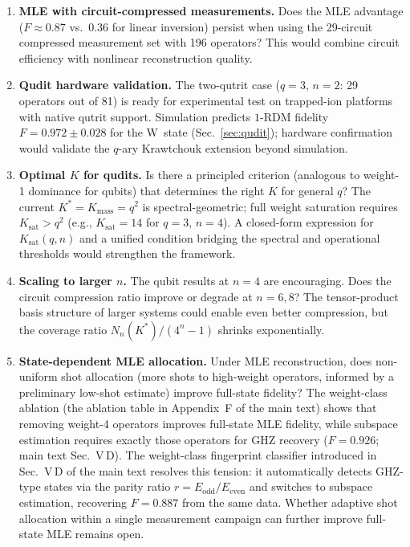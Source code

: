 \documentclass[twocolumn,prx,aps,superscriptaddress,longbibliography]{revtex4-2}
\begin{document}
\begin{enumerate}
\item \textbf{MLE with circuit-compressed measurements.}
Does the MLE advantage ($F \approx 0.87$ vs.\ $0.36$ for linear
inversion) persist when using the 29-circuit compressed measurement
set with 196 operators?  This would combine circuit efficiency with
nonlinear reconstruction quality.

\item \textbf{Qudit hardware validation.}
The two-qutrit case ($q = 3$, $n = 2$: 29 operators out of 81) is
ready for experimental test on trapped-ion platforms with native
qutrit support.  Simulation predicts $1$-RDM fidelity
$F = 0.972 \pm 0.028$ for the W~state
(Sec.~\ref{sec:qudit}); hardware confirmation would
validate the $q$-ary Krawtchouk extension beyond simulation.

\item \textbf{Optimal $K$ for qudits.}
Is there a principled criterion (analogous to weight-1 dominance
for qubits) that determines the right $K$ for general $q$?  The
current $K^* = K_{\mathrm{mass}} = q^2$ is spectral-geometric;
full weight saturation requires $K_{\mathrm{sat}} > q^2$
(e.g., $K_{\mathrm{sat}} = 14$ for $q = 3$, $n = 4$).
A closed-form expression for $K_{\mathrm{sat}}(q,n)$ and a
unified condition bridging the spectral and operational
thresholds would strengthen the framework.

\item \textbf{Scaling to larger $n$.}
The qubit results at $n = 4$ are encouraging.  Does the circuit
compression ratio improve or degrade at $n = 6, 8$?  The
tensor-product basis structure of larger systems could enable even
better compression, but the coverage ratio
$N_n(K^*) / (4^n - 1)$ shrinks exponentially.

\item \textbf{State-dependent MLE allocation.}
Under MLE reconstruction, does non-uniform shot allocation (more
shots to high-weight operators, informed by a preliminary low-shot
estimate) improve full-state fidelity?  The weight-class ablation
(the ablation table in Appendix~F of the main text) shows that removing
weight-4 operators improves full-state MLE fidelity, while
subspace estimation requires exactly those operators for GHZ
recovery ($F = 0.926$; main text Sec.~V\,D).
The weight-class fingerprint classifier introduced in
Sec.~V\,D of the main text resolves this tension: it automatically
detects GHZ-type states via the parity ratio $r = E_{\mathrm{odd}} /
E_{\mathrm{even}}$ and switches to subspace estimation, recovering
$F = 0.887$ from the same data.  Whether adaptive shot allocation
within a single measurement campaign can further improve full-state
MLE remains open.
\end{enumerate}
\end{document}
